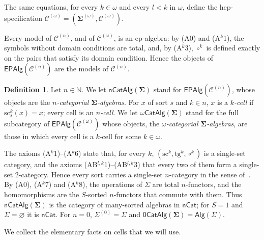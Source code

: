\documentclass[a4paper,reqno]{amsart}
\newcommand{\sig}[1]{\mathbf{#1}}                %
\newcommand{\spec}[1]{\boldsymbol{\mathcal{#1}}} %
\newcommand{\src}{\mathrm{sc}}
\newcommand{\tgt}{\mathrm{tg}}
\newcommand{\EPAlg}{\mathsf{EPAlg}}
\theoremstyle{plain}
\theoremstyle{definition}
\newtheorem{definition}[theorem]{Definition}
\begin{document}
The same equations, for every $k\in\omega$ and every $l<k$ in $\omega$, define the hep-specification $\spec{C}^{(\omega)}=(\sig{\Sigma}^{(\omega)},\mathcal{C}^{(\omega)})$.

Every model of $\mathcal{C}^{(n)}$, and of $\mathcal{C}^{(\omega)}$, is an ep-algebra: by (A0) and (A$^{k}$1), the symbols without domain conditions are total, and, by (A$^{k}$3), $\circ^{k}$ is defined exactly on the pairs that satisfy its domain condition.
Hence the objects of $\EPAlg(\spec{C}^{(n)})$ are the models of $\mathcal{C}^{(n)}$.

\begin{definition}\label{DCatAlg}
Let $n\in\mathbb{N}$.
We let $\mathsf{nCatAlg}(\sig{\Sigma})$ stand for $\EPAlg(\spec{C}^{(n)})$, whose objects are the \emph{$n$-categorial $\sig{\Sigma}$-algebras}.
For $x$ of sort $s$ and $k\in n$, $x$ is a \emph{$k$-cell} if $\src^{k}_{s}(x)=x$; every cell is an \emph{$n$-cell}.
We let $\omega\mathsf{CatAlg}(\sig{\Sigma})$ stand for the full subcategory of $\EPAlg(\spec{C}^{(\omega)})$ whose objects, the \emph{$\omega$-categorial $\sig{\Sigma}$-algebras}, are those in which every cell is a $k$-cell for some $k\in\omega$.
\end{definition}

The axioms (A$^{k}$1)--(A$^{k}$6) state that, for every $k$, $(\src^{k},\tgt^{k},\circ^{k})$ is a single-set category, and the axioms (AB$^{l,k}$1)--(AB$^{l,k}$3) that every two of them form a single-set $2$-category.
Hence every sort carries a single-set $n$-category in the sense of~\cite{Str87}.
By (A0), (A$^{k}$7) and (A$^{k}$8), the operations of $\Sigma$ are total $n$-functors, and the homomorphisms are the $S$-sorted $n$-functors that commute with them.
Thus $\mathsf{nCatAlg}(\sig{\Sigma})$ is the category of many-sorted algebras in $\mathsf{nCat}$; for $S=1$ and $\Sigma=\varnothing$ it is $\mathsf{nCat}$.
For $n=0$, $\Sigma^{(0)}=\Sigma$ and $\mathsf{0CatAlg}(\sig{\Sigma})=\mathsf{Alg}(\Sigma)$.

We collect the elementary facts on cells that we will use.
\end{document}
